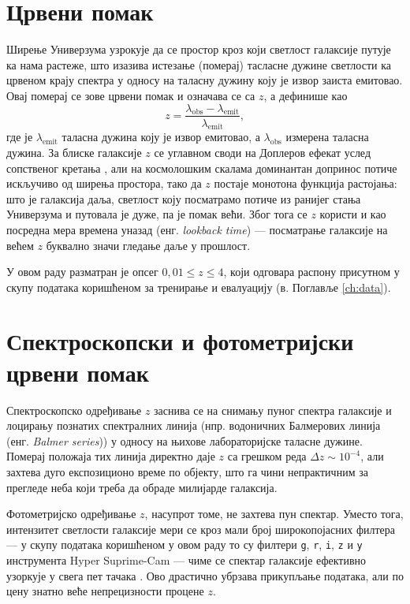 \documentclass[12pt,oneside]{memoir}
\begin{document}
\section{Црвени помак}
\label{sec:redshift}

Ширење Универзума узрокује да се простор кроз који светлост галаксије путује ка нама
растеже, што изазива истезање (померај) тасласне дужине светлости ка црвеном крају
спектра у односу на таласну дужину коју је извор заиста емитовао. Овај померај се 
зове црвени помак \cite{nasa2024redshift, esa_redshift} и означава се са $z$, а дефинише 
као
\[
  z = \frac{\lambda_{\mathrm{obs}} - \lambda_{\mathrm{emit}}}{\lambda_{\mathrm{emit}}},
\]
где је $\lambda_{\mathrm{emit}}$ таласна дужина коју је извор емитовао, а
$\lambda_{\mathrm{obs}}$ измерена таласна дужина. За блиске галаксије $z$ се
углавном своди на Доплеров ефекат услед сопственог кретања \cite{baa2022doppler,esa_redshift}, али на
космолошким скалама доминантан допринос потиче искључиво од ширења
простора, тако да $z$ постаје монотона функција растојања: што је галаксија
даља, светлост коју посматрамо потиче из ранијег стања Универзума и путовала
је дуже, па је помак већи. Због тога се $z$ користи и као посредна мера
времена уназад (енг. \textit{lookback time}) — посматрање галаксије на
већем $z$ буквално значи гледање даље у прошлост.

У овом раду разматран је опсег $0{,}01 \le z \le 4$, који одговара распону
присутном у скупу података коришћеном за тренирање и евалуацију (в.
Поглавље \ref{ch:data}).

\section{Спектроскопски и фотометријски црвени помак}
\label{sec:specphoto}

Спектроскопско одређивање $z$ заснива се на снимању пуног спектра галаксије
и лоцирању познатих спектралних линија (нпр. водоничних Балмерових линија (енг. \textit{Balmer series})) у
односу на њихове лабораторијске таласне дужине. Померај положаја тих линија
директно даје $z$ са грешком реда $\Delta z \sim 10^{-4}$, али захтева дуго
експозиционо време по објекту, што га чини непрактичним за прегледе неба
који треба да обраде милијарде галаксија.

Фотометријско одређивање $z$, насупрот томе, не захтева пун спектар. Уместо
тога, интензитет светлости галаксије мери се кроз мали број широкопојасних
филтера — у скупу података коришћеном у овом раду то су филтери \texttt{g},
\texttt{r}, \texttt{i}, \texttt{z} и \texttt{y} инструмента Hyper
Suprime-Cam — чиме се спектар галаксије ефективно узоркује у свега пет
тачака \cite{do2024}. Ово драстично убрзава прикупљање података, али по цену знатно веће
непрецизности процене $z$.
\end{document}
